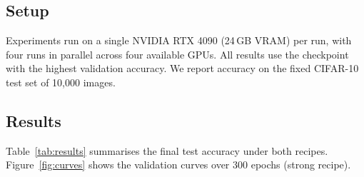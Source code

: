 \documentclass[10pt,twocolumn]{article}
\begin{document}
\subsection{Setup}
Experiments run on a single NVIDIA RTX 4090 (24\,GB VRAM) per run, with four
runs in parallel across four available GPUs.
All results use the checkpoint with the highest validation accuracy.
We report accuracy on the fixed CIFAR-10 test set of 10{,}000 images.

\subsection{Results}
Table~\ref{tab:results} summarises the final test accuracy under both recipes.
Figure~\ref{fig:curves} shows the validation curves over 300 epochs (strong recipe).
\end{document}
